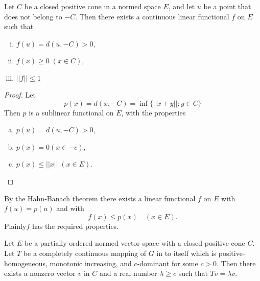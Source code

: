\setcounter{section}{4}
\setcounter{lemma}{0}
\begin{lemma}\label{chap4:lem4.1}%
  Let $C$ be a closed positive cone in a normed space $E$, and let $u$
  be a point that does not belong to $-C$. Then there exists a
  continuous linear functional $f$ on $E$ such that  
  \begin{enumerate}[(i)]
  \item $f (u) = d (u, -C) >0$,
  \item $ f (x) \geq 0 \; (x \in C)$,
  \item $|| f || \leq 1$
  \end{enumerate}
\end{lemma}

\begin{proof}
  Let
  $$
  p(x) = d (x,-C) = \inf \{|| x+y||: y \in C\} 
  $$
  Then $p$ is a sublinear functional on $E$, with the properties 
  \begin{enumerate}[(a)]
  \item $ p(u) = d (u,-C)>0$,
  \item $ p (x) = 0 (x \in -c)$,
  \item $p(x) \leq || x ||\; (x \in E)$.
  \end{enumerate}
\end{proof}

By the Hahn-Banach theorem there exists a linear functional $f$ on $E$
with $f(u) = p(u)$ and with  
$$
f (x) \leq  p(x) \quad  (x \in E).
$$
Plainly\pageoriginale $f$ has the required properties. 

\begin{thmm}%
  Let $E$ be a partially ordered normed vector space with a closed
  positive cone $C$. Let $T$ be a completely continuous mapping of $G$
  in to itself which is positive-homogeneous, monotonic increasing,
  and $c$-dominant for some $c > 0$. Then there exists a nonzero vector
  $v$ in $C$ and a real number $\lambda \geq c$ such that $Tv =
  \lambda v$. 
\end{thmm}

